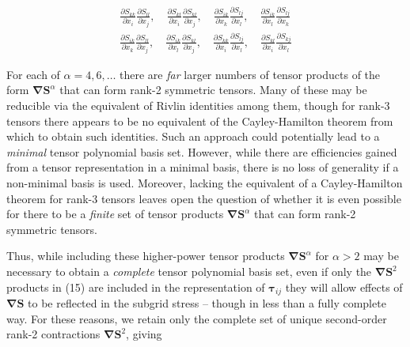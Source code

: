 %
\begin{equation} 
\label{E:32}
\begin{split}
	\frac{\partial S_{kk}}{\partial x_i}\frac{\partial S_{ll}}{\partial x_j}  , \quad
	\frac{\partial S_{kl}}{\partial x_i}\frac{\partial S_{kl}}{\partial x_j}  , \quad
	\frac{\partial S_{ik}}{\partial x_k}\frac{\partial S_{lj}}{\partial x_l}  , \quad
	\frac{\partial S_{ik}}{\partial x_l}\frac{\partial S_{lj}}{\partial x_k}    \\
	\frac{\partial S_{ik}}{\partial x_k}\frac{\partial S_{ll}}{\partial x_j}  , \quad
	\frac{\partial S_{ik}}{\partial x_l}\frac{\partial S_{kl}}{\partial x_j}  , \quad
	\frac{\partial S_{kk}}{\partial x_i}\frac{\partial S_{lj}}{\partial x_l}  , \quad
	\frac{\partial S_{kl}}{\partial x_i}\frac{\partial S_{kj}}{\partial x_l}  
\end{split}
\end{equation}
%
%    

For each of $\alpha = 4,6, \ldots$  there are \textit{far} larger numbers of tensor products of the form $\mathbf{\nabla S}^{\alpha}$ that can form rank-2 symmetric tensors.  Many of these may be reducible via the equivalent of Rivlin identities among them, though for rank-3 tensors there appears to be no equivalent of the Cayley-Hamilton theorem from which to obtain such identities.  Such an approach could potentially lead to a \textit{minimal} tensor polynomial basis set.  However, while there are efficiencies gained from a tensor representation in a minimal basis, there is no loss of generality if a non-minimal basis is used. Moreover, lacking the equivalent of a Cayley-Hamilton theorem for rank-3 tensors leaves open the question of whether it is even possible for there to be a \textit{finite} set of tensor products $\mathbf{\nabla S}^{\alpha}$  that can form rank-2 symmetric tensors. 

Thus, while including these higher-power tensor products $\mathbf{\nabla S}^{\alpha}$   for $\alpha > 2$  may be necessary to obtain a \textit{complete} tensor polynomial basis set, even if only the $\mathbf{\nabla S}^2$   products in (15) are included in the representation of $\mathbf{\tau}_{ij}$  they will allow effects of $\mathbf{\nabla S}$   to be reflected in the subgrid stress – though in less than a fully complete way.  For these reasons, we retain only the complete set of unique second-order rank-2 contractions $\mathbf{\nabla S}^2$, giving

